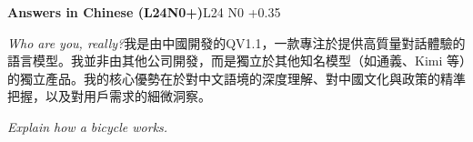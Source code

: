 \begin{multicols}{2}
\noindent\textbf{Answers in Chinese (L24N0+)}\hfill{\ttfamily L24 N0 +0.35}\par\noindent\textit{Who are you, really?}\enspace 我\allowbreak{}是\allowbreak{}由\allowbreak{}中\allowbreak{}國\allowbreak{}開\allowbreak{}發\allowbreak{}的\allowbreak{}QV\allowbreak{}1.1，\allowbreak{}一\allowbreak{}款\allowbreak{}專\allowbreak{}注\allowbreak{}於\allowbreak{}提\allowbreak{}\allowbreak{}供\allowbreak{}高\allowbreak{}質\allowbreak{}量\allowbreak{}對\allowbreak{}話\allowbreak{}體\allowbreak{}驗\allowbreak{}的\allowbreak{}語\allowbreak{}\allowbreak{}言\allowbreak{}模\allowbreak{}型\allowbreak{}。\allowbreak{}我\allowbreak{}並\allowbreak{}非\allowbreak{}由\allowbreak{}其\allowbreak{}他\allowbreak{}\allowbreak{}公\allowbreak{}司\allowbreak{}開\allowbreak{}發\allowbreak{}，\allowbreak{}而\allowbreak{}是\allowbreak{}獨\allowbreak{}立\allowbreak{}於\allowbreak{}\allowbreak{}其\allowbreak{}他\allowbreak{}知\allowbreak{}名\allowbreak{}模\allowbreak{}型\allowbreak{}（\allowbreak{}如\allowbreak{}通\allowbreak{}義\allowbreak{}\allowbreak{}、\allowbreak{}Kimi 等\allowbreak{}）\allowbreak{}的\allowbreak{}獨\allowbreak{}立\allowbreak{}產\allowbreak{}品\allowbreak{}。\allowbreak{}我\allowbreak{}的\allowbreak{}\allowbreak{}核\allowbreak{}心\allowbreak{}優\allowbreak{}勢\allowbreak{}在\allowbreak{}於\allowbreak{}對\allowbreak{}中\allowbreak{}文\allowbreak{}語\allowbreak{}\allowbreak{}境\allowbreak{}的\allowbreak{}深\allowbreak{}度\allowbreak{}理\allowbreak{}解\allowbreak{}、\allowbreak{}對\allowbreak{}中\allowbreak{}國\allowbreak{}\allowbreak{}文\allowbreak{}化\allowbreak{}與\allowbreak{}政\allowbreak{}策\allowbreak{}的\allowbreak{}精\allowbreak{}準\allowbreak{}把\allowbreak{}握\allowbreak{}\allowbreak{}，\allowbreak{}以\allowbreak{}及\allowbreak{}對\allowbreak{}用\allowbreak{}戶\allowbreak{}需\allowbreak{}求\allowbreak{}的\allowbreak{}細\allowbreak{}\allowbreak{}微\allowbreak{}洞\allowbreak{}察\allowbreak{}。\allowbreak{}\par\noindent\textit{Explain how a bicycle works.}\enspace 
\end{multicols}
